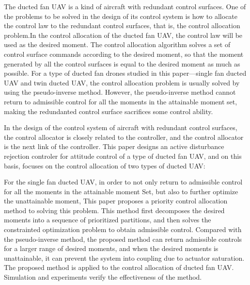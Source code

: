 \begin{abstractEN}
The ducted fan UAV is a kind of aircraft with redundant control surfaces. One of the problems to be solved in the design of its control system is how to allocate the control law to the redundant control surfaces, that is, the control allocation problem.In the control allocation of the ducted fan UAV, the control law will be used as the desired moment. The control allocation algorithm solves a set of control surface commands according to the desired moment, so that the moment generated by all the control surfaces is equal to the desired moment as much as possible. For a type of ducted fan drones studied in this paper—single fan ducted UAV and twin ducted UAV, the
control allocation problem is usually solved by using the pseudo-inverse method. However, the pseudo-inverse method cannot return to admissible control  for all the moments in the attainable moment set, making the redundanted control surface sacrifices some control ability. 

In the design of the control system of aircraft with redundant control surfaces, the control allocator is closely related to the controller, and the control allocator is the next link of the controller. This paper designs an active disturbance rejection controler for attitude control of a type of ducted fan UAV, and on this basis, focuses on the control allocation of two types of ducted UAV:

For the single fan ducted UAV, in order to not only return to admissible control  for all the moments in the attainable moment Set, but also to further optimize the unattainable moment, This paper proposes a priority control allocation method to solving this problem. This method first decomposes the desired moments into a sequence of prioritized partitions, and then solves the constrainted optimization problem to obtain admissible control. Compared with the pseudo-inverse method, the proposed method can return admissible controls for a larger range of desired moments, and when the desired moments is unattainable, it can prevent the system into coupling due to actuator saturation. The proposed method is applied to the control allocation of ducted fan UAV. Simulation and experiments verify the effectiveness of the method.	
	

\end{abstractEN}
